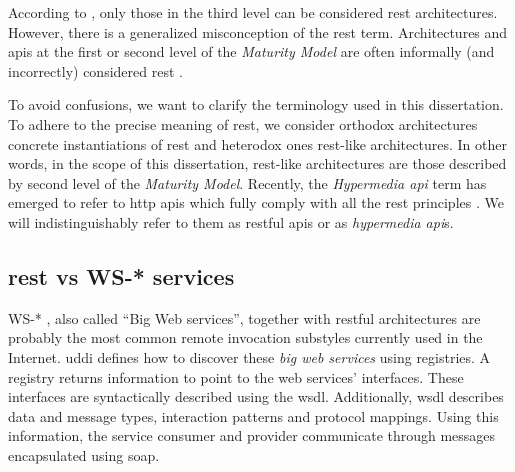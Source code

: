 According to \citet{fielding_architectural_2000}, only those in the third level can be considered \ac{rest} architectures.
However, there is a generalized misconception of the \ac{rest} term.
Architectures and \ac{api}s at the first or second level of the \emph{\citeauthor{richardson_introducing_2008} Maturity Model} are often informally (and incorrectly) considered \ac{rest} \citep{fielding_rest_2008,moore_hypermedia_2010,klabnik_nobody_2011}.


To avoid confusions, we want to clarify the terminology used in this dissertation.
To adhere to the precise meaning of \ac{rest}, we consider orthodox architectures concrete instantiations of \ac{rest} and heterodox ones \ac{rest}-like architectures.
In other words, in the scope of this dissertation, \ac{rest}-like architectures are those described by second level of the \emph{\citeauthor{richardson_introducing_2008} Maturity Model}.
Recently, the \emph{Hypermedia \ac{api}} term has emerged to refer to \acs{http} \ac{api}s which fully comply with all the \ac{rest} principles \citep{klabnik_rest_2012,moore_hypermedia_2010,amundsen_building_2011}.  %
We will indistinguishably refer to them as \ac{rest}ful \ac{api}s or as \emph{hypermedia \ac{api}}s.



\subsection{\acs{rest} vs WS-* services}
\label{sec:rest_ws}

WS-* \citep{newcomer_understanding_2002,alonso_web_2010}, also called ``Big Web services'', together with \acs{rest}ful architectures are probably the most common remote invocation substyles currently used in the Internet.
\ac{uddi} defines how to discover these \emph{big web services} using registries.
A registry returns information to point to the web services' interfaces.
These interfaces are syntactically described using the \ac{wsdl}.
Additionally, \ac{wsdl} describes data and message types, interaction patterns and protocol mappings.
Using this information, the service consumer and provider communicate through messages encapsulated using \ac{soap}.


